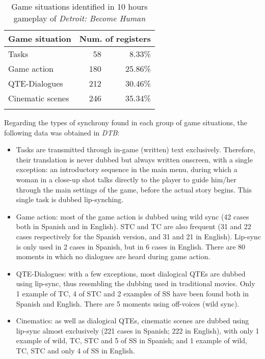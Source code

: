 \documentclass[output=paper]{langsci/langscibook}
\begin{document}
\begin{table}\caption{Game situations identified in 10 hours gameplay of \textit{Detroit: Become Human}}\label{lmc:game-tab}
  \begin{tabularx}{.8\textwidth}{Xrr}
    \lsptoprule
    \textbf{Game situation} & \multicolumn{2}{c}{\bfseries Num. of registers}\\
    \midrule
    Tasks             & 58  & 8.33\%\\
    Game action       & 180 & 25.86\%\\
    QTE-Dialogues     & 212 & 30.46\%\\
    Cinematic scenes  & 246 & 35.34\%\\
    \lspbottomrule
  \end{tabularx}
\end{table}

Regarding the types of synchrony found in each group of game situations, the following data was obtained in \emph{DTB}:

\begin{itemize}
  \item Tasks are transmitted through in-game (written) text exclusively. Therefore, their translation is never dubbed but always written onscreen, with a single exception: an introductory sequence in the main menu, during which a woman in a close-up shot talks directly to the player to guide him\slash her through the main settings of the game, before the actual story begins. This single task is dubbed lip-synching.
  \item Game action: most of the game action is dubbed using wild sync (42 cases both in Spanish and in English). STC and TC are also frequent (31 and 22 cases respectively for the Spanish version, and 31 and 21 in English). Lip-sync is only used in 2 cases in Spanish, but in 6 cases in English. There are 80 moments in which no dialogues are heard during game action. 
  \item QTE-Dialogues: with a few exceptions, most dialogical QTEs are dubbed using lip-sync, thus resembling the dubbing used in traditional movies. Only 1 example of TC, 4 of STC and 2 examples of SS have been found both in Spanish and English. There are 5 moments using off-voices (wild sync).
  \item Cinematics: as well as dialogical QTEs, cinematic scenes are dubbed using lip-sync almost exclusively (221 cases in Spanish; 222 in English), with only 1 example of wild, TC, STC and 5 of SS in Spanish; and 1 example of wild, TC, STC and only 4 of SS in English.
\end{itemize}
\end{document}
